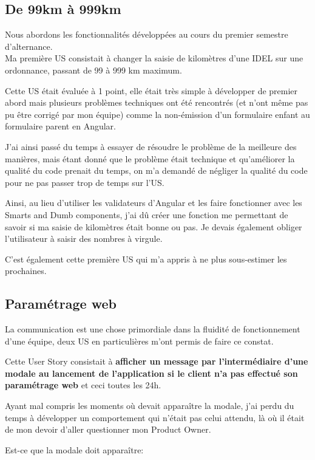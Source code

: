 \documentclass{article}
\begin{document}
\subsection{De 99km à 999km}
Nous abordons les fonctionnalités développées au cours du premier semestre d'alternance. \\

Ma première US consistait à changer la saisie de kilomètres d'une IDEL sur une ordonnance, passant de 99 à 999 km maximum. 

Cette US était évaluée à 1 point, elle était très simple à développer de premier abord mais plusieurs problèmes techniques ont été rencontrés (et n'ont même pas pu être corrigé par mon équipe) comme la non-émission d'un formulaire enfant au formulaire parent en Angular.

J'ai ainsi passé du temps à essayer de résoudre le problème de la meilleure des manières, mais étant donné que le problème était technique et qu'améliorer la qualité du code prenait du temps, on m'a demandé de négliger la qualité du code pour ne pas passer trop de temps sur l'US.

Ainsi, au lieu d'utiliser les validateurs d'Angular et les faire fonctionner avec les Smarts and Dumb components, j'ai dû créer une fonction me permettant de savoir si ma saisie de kilomètres était bonne ou pas. Je devais également obliger l'utilisateur à saisir des nombres à virgule.

C'est également cette première US qui m'a appris à ne plus sous-estimer les prochaines.

\subsection{Paramétrage web}

La communication est une chose primordiale dans la fluidité de fonctionnement d'une équipe, deux US en particulières m'ont permis de faire ce constat.

Cette User Story consistait à \textbf{afficher un message par l'intermédiaire d'une modale au lancement de l'application si le client n'a pas effectué son paramétrage web} et ceci toutes les 24h.

Ayant mal compris les moments où devait apparaître la modale, j'ai perdu du temps à développer un comportement qui n'était pas celui attendu, là où il était de mon devoir d'aller questionner mon Product Owner.

Est-ce que la modale doit apparaître:
\end{document}
